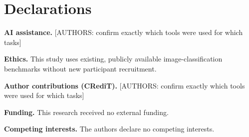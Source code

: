 \documentclass[twoside,a4paper,11pt]{article}
\newif\ifblindreview
\begin{document}
\par\noindent\begin{minipage}{\linewidth}
\section*{Declarations}
\noindent\textbf{AI assistance.} [AUTHORS: confirm exactly which tools were used for which tasks]

\noindent\textbf{Ethics.} This study uses existing, publicly available image-classification benchmarks without new participant recruitment.

\ifblindreview\else
\noindent\textbf{Author contributions (CRediT).} [AUTHORS: confirm exactly which tools were used for which tasks]
\fi

\noindent\textbf{Funding.} This research received no external funding.

\noindent\textbf{Competing interests.} The authors declare no competing interests.

\end{minipage}


\begingroup\small
\setlength{\bibsep}{3pt}


\endgroup
\end{document}
